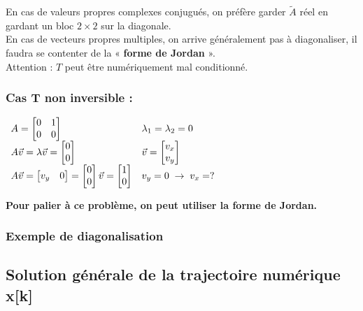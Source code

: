 \documentclass[document.tex]{subfiles}
\begin{document}
En cas de valeurs propres complexes conjugués, on préfère garder $\tilde{A}$ réel en gardant un bloc $2\times 2$ sur la diagonale.\\
En cas de vecteurs propres multiples, on arrive généralement pas à diagonaliser, il faudra se contenter de la « \textbf{forme de Jordan} ».\\
Attention : $T$ peut être numériquement mal conditionné.\\

\subsubsection{Cas T non inversible : }
\begin{center}$
\begin{array}{l l}
	A = \begin{bmatrix} 0 & 1 \\ 0 & 0 \end{bmatrix} & \lambda_1 = \lambda_2 = 0 \\
	A \vec{v} = \lambda \vec{v} = \begin{bmatrix} 0 \\ 0 \end{bmatrix} & \vec{v} = \begin{bmatrix} v_x \\ v_y \end{bmatrix} \\
	A \vec{v} = \begin{bmatrix} v_y & 0 \end{bmatrix} = \begin{bmatrix} 0 \\ 0 \end{bmatrix} \vec{v} = \begin{bmatrix} 1 \\ 0 \end{bmatrix} & v_y = 0 \; \rightarrow \; v_x = ?
	\end{array}$
\end{center}

\textbf{Pour palier à ce problème, on peut utiliser la forme de Jordan.}

\subsubsection{Exemple de diagonalisation}


\subsection{Solution générale de la trajectoire numérique x[k]}
\end{document}
